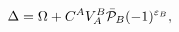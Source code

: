 \begin{equation}\label{25}
\Delta=\Omega+C^AV_A^B\bar{\cal P}_B(-1)^{\varepsilon_B},
\end{equation}

